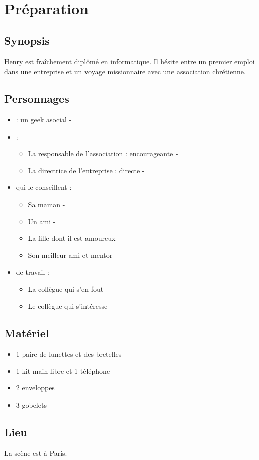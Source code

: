 \section{Préparation}

	\subsection{Synopsis}

	Henry est fraîchement diplômé en informatique.
	Il hésite entre un premier emploi dans une entreprise
	et un voyage missionnaire avec une association
	chrétienne.

	\subsection{Personnages}
	
	\begin{itemize}
	\item {} : un geek asocial - 
	\item {} : 
		\begin{itemize}
		\item La responsable de l'association : encourageante  -  
		\item La directrice de l'entreprise : directe - 
		\end{itemize}
	\item {} qui le conseillent :
		\begin{itemize}
		\item Sa maman - 
		\item Un ami - 
		\item La fille dont il est amoureux - 
		\item Son meilleur ami et mentor - 
		\end{itemize}
	\item {} de travail :
		\begin{itemize}
		\item La collègue qui s'en fout - 
		\item Le collègue qui s'intéresse - 
		\end{itemize}
	\end{itemize}
	
	\subsection{Matériel}
	
	\begin{itemize}
	\item 1 paire de lunettes et des bretelles
	\item 1 kit main libre et 1 téléphone
	\item 2 enveloppes
	\item 3 gobelets
	\end{itemize}
	
	\subsection{Lieu}
	
	La scène est à Paris.